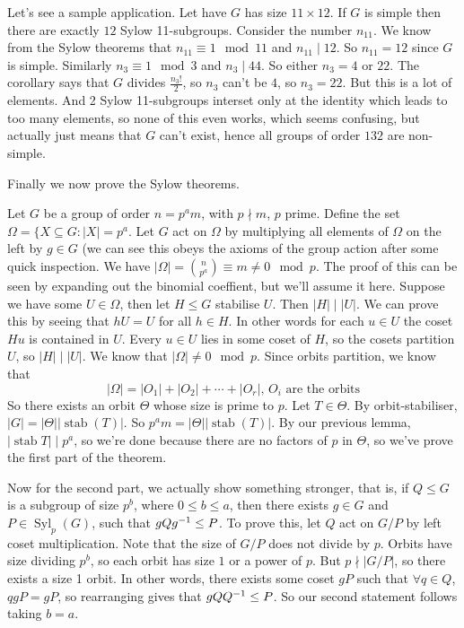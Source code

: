 \documentclass{article}
\DeclareMathOperator{\stab}{stab}
\DeclareMathOperator{\syl}{Syl}
\begin{document}
\par
Let's see a sample application. Let have $ G $ has size $ 11\times 12 $. If $ G $ is simple then there are exactly $ 12 $ Sylow 11-subgroups. Consider the number $ n_{11} $. We know from the Sylow theorems that $ n_{11}\equiv 1\mod 11 $ and $ n_{11}\mid 12 $. So $ n_{11} = 12 $ since $ G $ is simple. Similarly $ n_3\equiv 1 \mod 3 $ and $ n_3\mid 44 $. So either $ n_3 = 4 $ or $ 22 $. The corollary says that $ G $ divides $ \frac{n_3!}2 $, so $ n_3 $ can't be $ 4 $, so $ n_3=22 $. But this is a lot of elements. And 2 Sylow 11-subgroups interset only at the identity which leads to too many elements, so none of this even works, which seems confusing, but actually just means that $ G $ can't exist, hence all groups of order $ 132 $ are non-simple.

\par
Finally we now prove the Sylow theorems.

\pf Let $ G $ be a group of order $ n=p^am $, with $ p\nmid m $, $ p $ prime. Define the set $ \Omega=\{X\subseteq G : |X|=p^a $. Let $ G $ act on $ \Omega $ by multiplying all elements of $ \Omega $ on the left by $ g\in G $ (we can see this obeys the axioms of the group action after some quick inspection. We have $ |\Omega|= \binom{n}{p^a}\equiv m\ne 0\mod p $. The proof of this can be seen by expanding out the binomial coeffient, but we'll assume it here. Suppose we have some $ U\in\Omega $, then let $ H\le G $ stabilise $ U $. Then $ |H|\mid |U| $. We can prove this by seeing that $ hU=U $ for all $ h\in H $. In other words for each $ u\in U $ the coset $ Hu $ is contained in $ U $. Every $ u\in U $ lies in some coset of $ H $, so the cosets partition $ U $, so $ |H|\mid |U| $. We know that $ |\Omega|\ne 0\mod p $. Since orbits partition, we know that
	\[
		|\Omega|=|O_1|+|O_2|+\cdots +|O_r|\text{, } O_i \text{ are the orbits}
	\]
So there exists an orbit $ \Theta $ whose size is prime to $ p $.
Let $ T\in\Theta $. By orbit-stabiliser, $ |G|=|\Theta||\stab(T)| $. So $ p^am=|\Theta||\stab(T)| $. By our previous lemma, $ |\stab T|\mid p^a $, so we're done because there are no factors of $ p $ in $ \Theta $, so we've prove the first part of the theorem.

\par
Now for the second part, we actually show something stronger, that is, if $ Q\le G $ is a subgroup of size $ p^b $, where $ 0\le b\le a $, then there exists $ g\in G $ and $ P\in \syl_p(G) $, such that $ gQ{g}^{-1}\le P $. To prove this, let $ Q $ act on $ G/P $ by left coset multiplication. Note that the size of $ G/P $ does not divide by $ p $. Orbits have size dividing $ p^b $, so each orbit has size $ 1 $ or a power of $ p $. But $ p\nmid |G/P| $, so there exists a size 1 orbit. In other words, there exists some coset $ gP $ such that $ \forall q\in Q $, $ qgP=gP $, so rearranging gives that $ gQ{Q}^{-1}\le P $. So our second statement follows taking $ b=a $.
\end{document}
